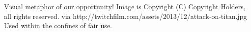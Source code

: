Visual metaphor of our opportunity! Image is Copyright (C) Copyright Holders, all rights reserved. via http://twitchfilm.com/assets/2013/12/attack-on-titan.jpg Used within the confines of fair use.